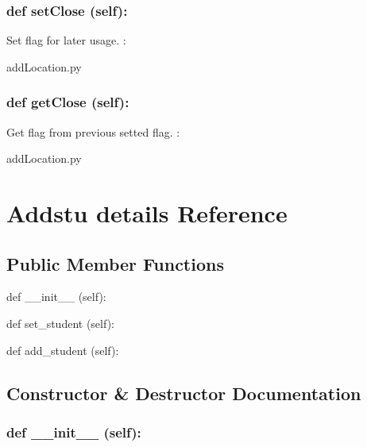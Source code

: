 \hypertarget{class_poly_a14a7ad77ce612b0c54f531d307ee4b39}{
\subsubsection[{def setClose(self):}]{\setlength{\rightskip}{0pt plus 5cm}def {setClose} (self):}}\label{class_poly_a14a7ad77ce612b0c54f531d307ee4b39}
Set flag for later usage.
:\begin{DoxyCompactItemize}
\item 
addLocation.\-py\end{DoxyCompactItemize}

\hypertarget{class_poly_a14a7ad77ce612b0c54f531d307ee4b39}{
\subsubsection[{def getClose(self):}]{\setlength{\rightskip}{0pt plus 5cm}def {getClose} (self):}}\label{class_poly_a14a7ad77ce612b0c54f531d307ee4b39}
Get flag from previous setted flag.
:\begin{DoxyCompactItemize}
\item 
addLocation.\-py\end{DoxyCompactItemize}



\hypertarget{Addstu_details}{\section{Addstu details Reference}
\label{Addstu_details}
}
\subsection*{Public Member Functions}
\begin{DoxyCompactItemize}
\item 
def {\_\_init\_\_} (self):
\item 
def {set\_student} (self):
\item 
def {add\_student} (self):


\end{DoxyCompactItemize}

\subsection{Constructor \& Destructor Documentation}
\hypertarget{class_poly_aa3def076b74bed67904976ad4f9fe9b1}{
\subsubsection[{def __init__ (self):}]{\setlength{\rightskip}{0pt plus 5cm}def {\_\_init\_\_} (self): 
}}

